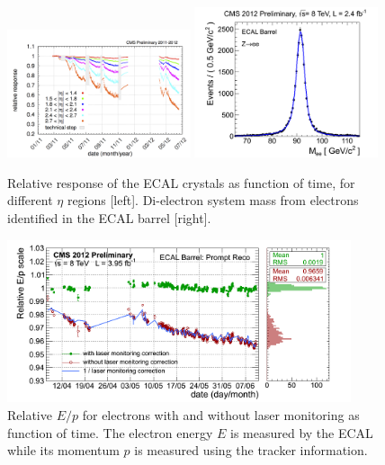 \begin{figure}[!Hhtbp]
  \begin{center}
    \includegraphics[width=0.48\textwidth]{figs/laser_monitoring_histories_2011-2012.png}
    \includegraphics[width=0.48\textwidth]{figs/_500___2012_zee_eb_golden.png}
    \caption{Relative response of the ECAL crystals as function of time, for different $\eta$ regions [left]. Di-electron system mass from electrons identified in the ECAL barrel [right].}
    \label{fig:RelaResp}
  \end{center}
\end{figure}

\begin{figure}[!Hhtbp]
  \begin{center}
    \includegraphics[width=0.9\textwidth]{figs/EoverP_history_2012.png}
    \caption{Relative $E/p$ for electrons with and without laser monitoring as function of time. The electron energy $E$ is measured by the ECAL while its momentum $p$ is measured using the tracker information.}
    \label{figs:RelEp}
  \end{center}
\end{figure}

